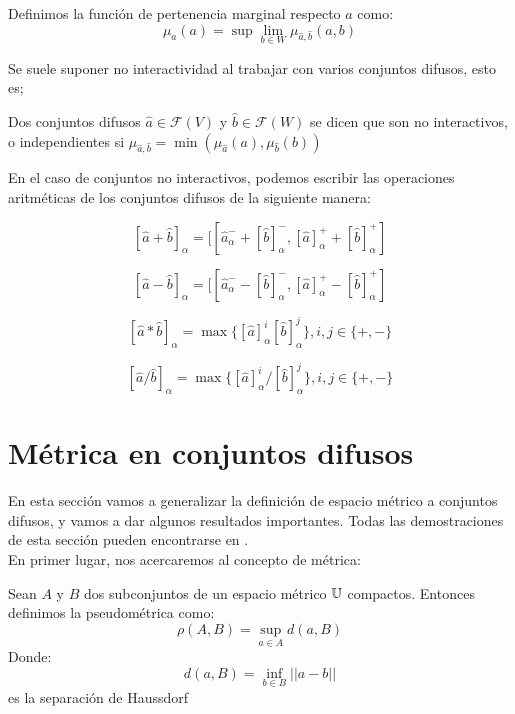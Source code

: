 \begin{definicion}
	Definimos la función de pertenencia marginal respecto $a$ como:
	\[
	\mu_a(a) = \sup\lim\limits_{b \in W} \mu_{\hat{a}, \hat{b}} (a, b)
	\]
\end{definicion}

Se suele suponer no interactividad al trabajar con varios conjuntos difusos, esto es;

\begin{definicion}
	Dos conjuntos difusos $\hat{a} \in \mathcal{F}(V)$ y $\hat{b} \in \mathcal{F}(W)$ se dicen que son no interactivos, o independientes si $\mu_{\hat{a}, \hat{b}} = \min(\mu_{\hat{a}}(a), \mu_{\hat{b}}(b))$
\end{definicion}

\begin{ejemplo}
En el caso de conjuntos no interactivos, podemos escribir las operaciones aritméticas de los conjuntos difusos de la siguiente manera:

\[
[\hat{a} + \hat{b}]_\alpha = [[\hat{a}^-_\alpha + [\hat{b}]_\alpha^-, [\hat{a}]^+_\alpha + [\hat{b}]_\alpha^+]
\]

\[
[\hat{a} - \hat{b}]_\alpha = [[\hat{a}^-_\alpha - [\hat{b}]_\alpha^-, [\hat{a}]^+_\alpha - [\hat{b}]_\alpha^+]
\]

\[
[\hat{a} * \hat{b}]_\alpha = \max\{ [\hat{a}]_\alpha^i [\hat{b}]^j_\alpha \}, i, j \in \{+, -\}
\]

\[
[\hat{a} / \hat{b}]_\alpha = \max\{ [\hat{a}]_\alpha^i / [\hat{b}]^j_\alpha \}, i, j \in \{+, -\}
\]
\end{ejemplo}

\section{Métrica en conjuntos difusos}
En esta sección vamos a generalizar la definición de espacio métrico a conjuntos difusos, y vamos a dar algunos resultados importantes. Todas las demostraciones de esta sección pueden encontrarse en \cite{apuntesfuzzy}. \\
En primer lugar, nos acercaremos al concepto de métrica:

\begin{definicion}[Pseudométrica]
	Sean $A$ y $B$ dos subconjuntos de un espacio métrico $\mathbb U$ compactos. Entonces definimos la pseudométrica como:
	\[
		\rho(A, B) = \sup\limits_{a \in A} d(a, B)
	\]
	Donde:
	\[
		d(a, B) = \inf\limits_{b \in B} ||a-b||
	\]
	es la separación de Haussdorf
\end{definicion}

